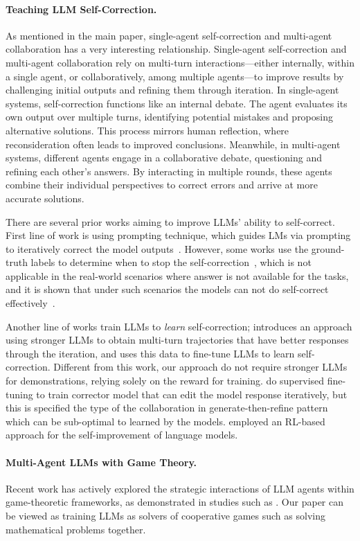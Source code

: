 \paragraph{Teaching LLM Self-Correction.}
As mentioned in the main paper, single-agent self-correction and multi-agent collaboration has a very interesting relationship. Single-agent self-correction and multi-agent collaboration rely on multi-turn interactions—either internally, within a single agent, or collaboratively, among multiple agents—to improve results by challenging initial outputs and refining them through iteration. In single-agent systems, self-correction functions like an internal debate. The agent evaluates its own output over multiple turns, identifying potential mistakes and proposing alternative solutions. This process mirrors human reflection, where reconsideration often leads to improved conclusions. Meanwhile, in multi-agent systems, different agents engage in a collaborative debate, questioning and refining each other’s answers. By interacting in multiple rounds, these agents combine their individual perspectives to correct errors and arrive at more accurate solutions. 

There are several prior works aiming to improve LLMs' ability to self-correct. First line of work is using prompting technique, which guides LMs via prompting to iteratively correct the model outputs~\citep{madaan2024self}. However, some works use the ground-truth labels to determine when to stop the self-correction~\citep{kim2024language, shinn2024reflexion, yao2022react}, which is not applicable in the real-world scenarios where answer is not available for the tasks, and it is shown that under such scenarios the models can not do self-correct effectively~\citep{huang2023large}.

Another line of works train LLMs to \textit{learn} self-correction; \citet{qu2024recursive} introduces an approach using stronger LLMs to obtain multi-turn trajectories that have better responses through the iteration, and uses this data to fine-tune LLMs to learn self-correction. Different from this work, our approach do not require stronger LLMs for demonstrations, relying solely on the reward for training. \citet{welleckgenerating} do supervised fine-tuning to train corrector model that can edit the model response iteratively, but this is specified the type of the collaboration in generate-then-refine pattern which can be sub-optimal to learned by the models. \citep{kumar2024training} employed an RL-based approach for the self-improvement of language models.

\paragraph{Multi-Agent LLMs with Game Theory.} 
Recent work has actively explored the strategic interactions of LLM agents within game-theoretic frameworks, as demonstrated in studies such as \citep{park2024llm, brookins2023playing, akata2023playing, lore2023strategic, fan2023can}. Our paper can be viewed as training LLMs as solvers of cooperative games such as solving mathematical problems together. 








